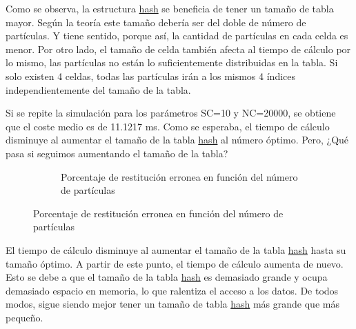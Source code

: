 \documentclass{article}
\begin{document}
Como se observa, la estructura \hyperref[sec:hash]{hash} se beneficia de tener un tamaño de tabla mayor. Según la teoría este tamaño debería ser del doble de número de partículas. Y tiene sentido, porque así, la cantidad de partículas en cada celda es menor. Por otro lado, el tamaño de celda también afecta al tiempo de cálculo por lo mismo, las partículas no están lo suficientemente distribuidas en la tabla. Si solo existen 4 celdas, todas las partículas irán a los mismos 4 índices independientemente del tamaño de la tabla.

Si se repite la simulación para los parámetros SC=10 y NC=20000, se obtiene que el coste medio es de 11.1217 ms. Como se esperaba, el tiempo de cálculo disminuye al aumentar el tamaño de la tabla \hyperref[sec:hash]{hash} al número óptimo. Pero, ¿Qué pasa si seguimos aumentando el tamaño de la tabla?

\begin{figure}[H]
    \centering
    \begin{subfigure}{0.48\textwidth}
        \centering
        \caption{Porcentaje de restitución erronea en función del número de partículas}

        \label{fig:hash_E}
    \end{subfigure}
\end{figure}

El tiempo de cálculo disminuye al aumentar el tamaño de la tabla \hyperref[sec:hash]{hash} hasta su tamaño óptimo. A partir de este punto, el tiempo de cálculo aumenta de nuevo. Esto se debe a que el tamaño de la tabla \hyperref[sec:hash]{hash} es demasiado grande y ocupa demasiado espacio en memoria, lo que ralentiza el acceso a los datos. De todos modos, sigue siendo mejor tener un tamaño de tabla \hyperref[sec:hash]{hash} más grande que más pequeño.
\end{document}
